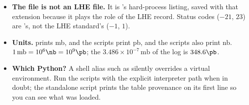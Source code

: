 \begin{pitfalls}
\begin{itemize}[nosep]
  \item \textbf{The  file is not an LHE file.} It is \PYTHIA's
    hard-process listing, saved with that extension because it plays the role
    of the LHE record. Status codes ($-21$, $23$) are \PYTHIA's, not the LHE
    standard's ($-1$, $1$).
  \item \textbf{Units.} \PYTHIA prints mb, \MG and the scripts print pb, and
    the scripts also print nb. $1\,\mathrm{mb}=10^{6}\nb=10^{9}\pb$; the
    $3.486\times10^{-7}\,\mathrm{mb}$ of the log is $348.6\pb$.
  \item \textbf{Which Python?} A shell alias such as
     silently overrides a virtual
    environment. Run the scripts with the explicit interpreter path when in
    doubt; the standalone script prints the table provenance on its first
    line so you can see what was loaded.
\end{itemize}
\end{pitfalls}

